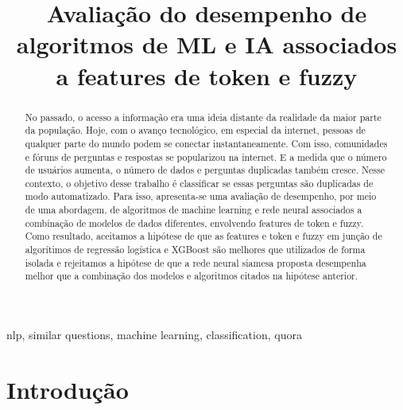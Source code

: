 \documentclass[conference]{IEEEtran}
\begin{document}
\title{Avaliação do desempenho de algoritmos de ML e IA associados a features de token e fuzzy}

\author{
\and
{}
}

\maketitle

\begin{abstract}
No passado, o acesso a informação era uma ideia distante da realidade da maior parte da população. Hoje, com o avanço tecnológico, em especial da internet, pessoas de qualquer parte do mundo podem se conectar instantaneamente. Com isso, comunidades e fóruns de perguntas e respostas se popularizou na internet. E a medida que o número de usuários aumenta, o número de dados e perguntas duplicadas também cresce. Nesse contexto, o objetivo desse trabalho é classificar se essas perguntas são duplicadas de modo automatizado. Para isso, apresenta-se uma avaliação de desempenho, por meio de uma abordagem, de algoritmos de machine learning e rede neural associados a combinação de modelos de dados diferentes, envolvendo features de token e fuzzy. Como resultado, aceitamos a hipótese de que as features e token e fuzzy em junção de algorítimos de regressão logística e XGBoost são melhores que utilizados de forma isolada e rejeitamos a hipótese de que a rede neural siamesa proposta desempenha melhor que a combinação dos modelos e algoritmos citados na hipótese anterior. 

\end{abstract}

\begin{IEEEkeywords}
nlp, similar questions, machine learning, classification, quora
\end{IEEEkeywords}

\section{Introdução}
\end{document}
